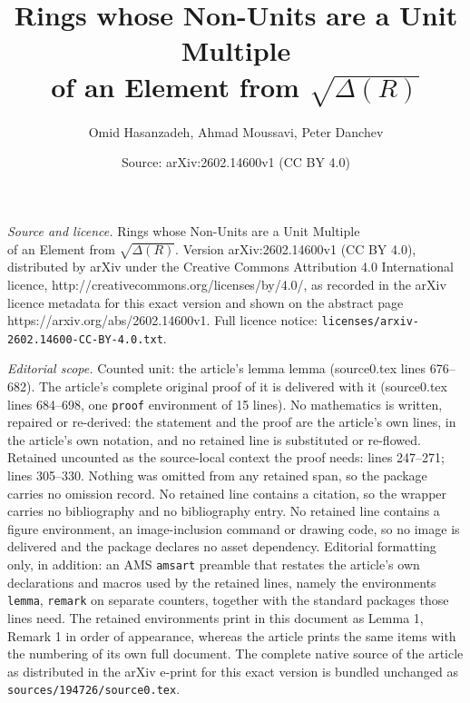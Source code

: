 \documentclass[10pt,a4paper]{amsart}
\title{Rings whose Non-Units are a Unit Multiple \\ of an Element from $\sqrt{\Delta(R)}$}
\author{Omid Hasanzadeh, Ahmad Moussavi, Peter Danchev}
\date{Source: arXiv:2602.14600v1 (CC BY 4.0)}
\begin{document}
\maketitle

\noindent\emph{Source and licence.} Rings whose Non-Units are a Unit Multiple \\ of an Element from $\sqrt{\Delta(R)}$. Version arXiv:2602.14600v1 (CC BY 4.0), distributed by arXiv under the Creative Commons Attribution 4.0 International licence, http://creativecommons.org/licenses/by/4.0/, as recorded in the arXiv licence metadata for this exact version and shown on the abstract page https://arxiv.org/abs/2602.14600v1. Full licence notice: \texttt{licenses/arxiv-2602.14600-CC-BY-4.0.txt}.\par\smallskip

\noindent\textit{Editorial scope.} Counted unit: the article's lemma lemma (source0.tex lines 676--682). The article's complete original proof of it is delivered with it (source0.tex lines 684--698, one \texttt{proof} environment of 15 lines). No mathematics is written, repaired or re-derived: the statement and the proof are the article's own lines, in the article's own notation, and no retained line is substituted or re-flowed.  Retained uncounted as the source-local context the proof needs: lines 247--271; lines 305--330.  Nothing was omitted from any retained span, so the package carries no omission record.  No retained line contains a citation, so the wrapper carries no bibliography and no bibliography entry.  No retained line contains a figure environment, an image-inclusion command or drawing code, so no image is delivered and the package declares no asset dependency.  Editorial formatting only, in addition: an AMS \texttt{amsart} preamble that restates the article's own declarations and macros used by the retained lines, namely the environments \texttt{lemma}, \texttt{remark} on separate counters, together with the standard packages those lines need.  The retained environments print in this document as Lemma 1, Remark 1 in order of appearance, whereas the article prints the same items with the numbering of its own full document.  The complete native source of the article as distributed in the arXiv e-print for this exact version is bundled unchanged as \texttt{sources/194726/source0.tex}.
\end{document}
